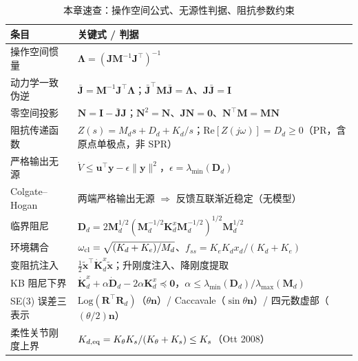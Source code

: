 \begin{table}[H]\centering\small
\caption{本章速查：操作空间公式、无源性判据、阻抗参数约束}
\label{tab:os-cheatsheet}
\begin{tabular}{p{} p{}}
\toprule
条目 & 关键式 / 判据 \\
\midrule
操作空间惯量 & $\boldsymbol\Lambda=(\mathbf J\mathbf M^{-1}\mathbf J^\top)^{-1}$ \\
动力学一致伪逆 & $\bar{\mathbf J}=\mathbf M^{-1}\mathbf J^\top\boldsymbol\Lambda$；$\bar{\mathbf J}^\top\mathbf M\bar{\mathbf J}=\boldsymbol\Lambda$、$\mathbf J\bar{\mathbf J}=\mathbf I$ \\
零空间投影 & $\mathbf N=\mathbf I-\bar{\mathbf J}\mathbf J$；$\mathbf N^2=\mathbf N$、$\mathbf J\mathbf N=\mathbf 0$、$\mathbf N^\top\mathbf M=\mathbf M\mathbf N$ \\
阻抗传递函数 & $Z(s)=M_d s+D_d+K_d/s$；$\mathrm{Re}[Z(j\omega)]=D_d\ge0$（PR，含原点单极点，非 SPR） \\
严格输出无源 & $\dot V\le\mathbf u^\top\mathbf y-\epsilon\|\mathbf y\|^2$，$\epsilon=\lambda_{\min}(\mathbf D_d)$ \\
Colgate--Hogan & 两端严格输出无源 $\Rightarrow$ 反馈互联渐近稳定（无模型） \\
临界阻尼 & $\mathbf D_d=2\mathbf M_d^{1/2}(\mathbf M_d^{-1/2}\mathbf K_d^x\mathbf M_d^{-1/2})^{1/2}\mathbf M_d^{1/2}$ \\
环境耦合 & $\omega_{\rm cl}=\sqrt{(K_d+K_e)/M_d}$、$f_{ss}=K_eK_d x_d/(K_d+K_e)$ \\
变阻抗注入 & $\tfrac12\tilde{\mathbf x}^\top\dot{\mathbf K}_d^x\tilde{\mathbf x}$；升刚度注入、降刚度提取 \\
KB 阻尼下界 & $\dot{\mathbf K}_d^x+\alpha\dot{\mathbf D}_d-2\alpha\mathbf K_d^x\preceq\mathbf 0$，$\alpha\le\lambda_{\min}(\mathbf D_d)/\lambda_{\max}(\mathbf M_d)$ \\
SE(3) 误差三表示 & $\mathrm{Log}(\mathbf R^\top\mathbf R_d)$（$\theta\mathbf n$）/ Caccavale（$\sin\theta\mathbf n$）/ 四元数虚部（$(\theta/2)\mathbf n$） \\
柔性关节刚度上界 & $K_{d,\rm eq}=K_\theta K_s/(K_\theta+K_s)\le K_s$（Ott 2008\cite{ott2008cartesian}） \\
\bottomrule
\end{tabular}
\end{table}

